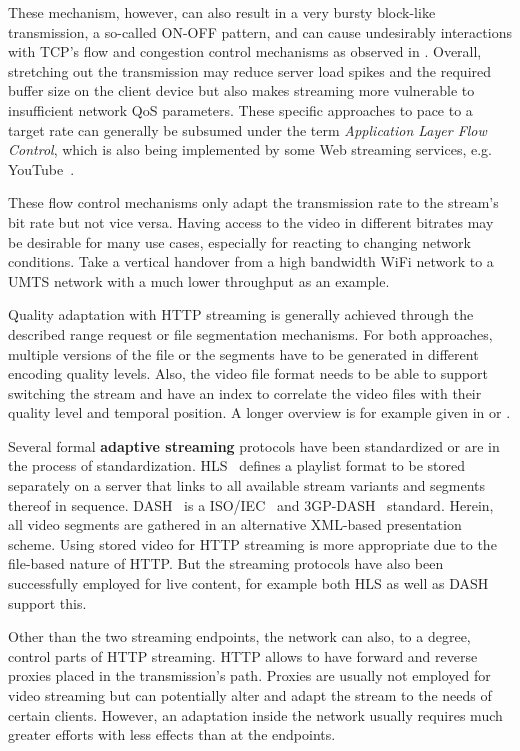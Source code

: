 These mechanism, however, can also result in a very bursty block-like transmission, a so-called ON-OFF pattern, and can cause undesirably interactions with \gls{TCP}'s flow and congestion control mechanisms as observed in \cite{alcock2011afcyt}. Overall, stretching out the transmission may reduce server load spikes and the required buffer size on the client device but also makes streaming more vulnerable to insufficient network \gls{QoS} parameters. These specific approaches to pace to a target rate can generally be subsumed under the term \textit{Application Layer Flow Control}, which is also being implemented by some Web streaming services, e.g. YouTube~\cite{metzger2011delivery}.

These flow control mechanisms only adapt the transmission rate to the stream's bit rate but not vice versa. Having access to the video in different bitrates may be desirable for many use cases, especially for reacting to changing network conditions. Take a vertical handover from a high bandwidth WiFi network to a \gls{UMTS} network with a much lower throughput as an example. 

Quality adaptation with \gls{HTTP} streaming is generally achieved through the described range request or file segmentation mechanisms. For both approaches, multiple versions of the file or the segments have to be generated in different encoding quality levels. Also, the video file format needs to be able to support switching the stream and have an index to correlate the video files with their quality level and temporal position. A longer overview is for example given in \cite{ma2011mobile} or \cite{watching-video1}.

Several formal \textbf{adaptive streaming} protocols have been standardized or are in the process of standardization. \gls{HLS}~\cite{pantos2011livestreaming} defines a playlist format to be stored separately on a server that links to all available stream variants and segments thereof in sequence. \gls{DASH}~\cite{Stockhammer:2011:DAS:1943552.1943572} is a \gls{ISO}/\gls{IEC}~\cite{iso-iec-23009-1} and 3GP-DASH~\cite{3gpp.26.247} standard. Herein, all video segments are gathered in an alternative \acrshort{XML}-based presentation scheme. Using stored video for \gls{HTTP} streaming is more appropriate due to the file-based nature of \gls{HTTP}. But the streaming protocols have also been successfully employed for live content, for example both \gls{HLS} as well as \gls{DASH} support this.

Other than the two streaming endpoints, the network can also, to a degree, control parts of \gls{HTTP} streaming. \gls{HTTP} allows to have forward and reverse proxies placed in the transmission's path. Proxies are usually not employed for video streaming but can potentially alter and adapt the stream to the needs of certain clients. However, an adaptation inside the network usually requires much greater efforts with less effects than at the endpoints.

